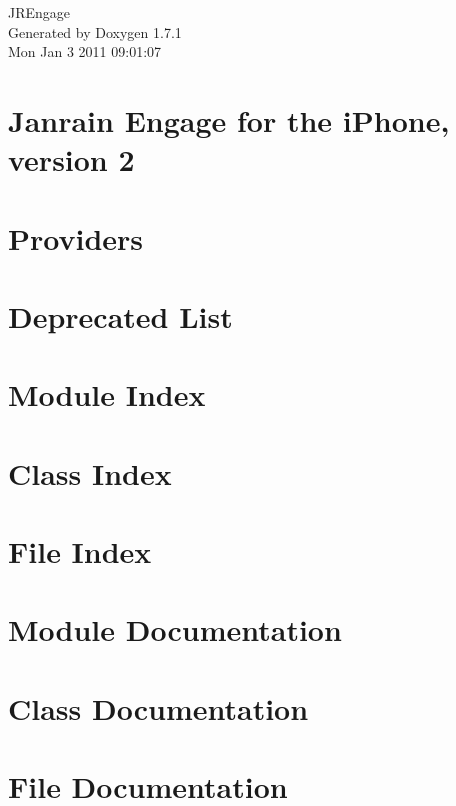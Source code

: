 \documentclass[a4paper]{book}
\begin{document}
\hypersetup{pageanchor=false}
\begin{titlepage}
\vspace*{7cm}
\begin{center}
{\Large JREngage }\\
\vspace*{1cm}
{\large Generated by Doxygen 1.7.1}\\
\vspace*{0.5cm}
{\small Mon Jan 3 2011 09:01:07}\\
\end{center}
\end{titlepage}
\clearemptydoublepage
{}
\tableofcontents
\clearemptydoublepage
{}
\hypersetup{pageanchor=true}
\chapter{Janrain Engage for the iPhone, version 2}
\label{index}\hypertarget{index}{}
\chapter{Providers}
\label{Providers}
\hypertarget{Providers}{}

\chapter{Deprecated List}
\label{deprecated}
\hypertarget{deprecated}{}

\chapter{Module Index}

\chapter{Class Index}

\chapter{File Index}

\chapter{Module Documentation}

\chapter{Class Documentation}









\chapter{File Documentation}


\printindex
\end{document}
